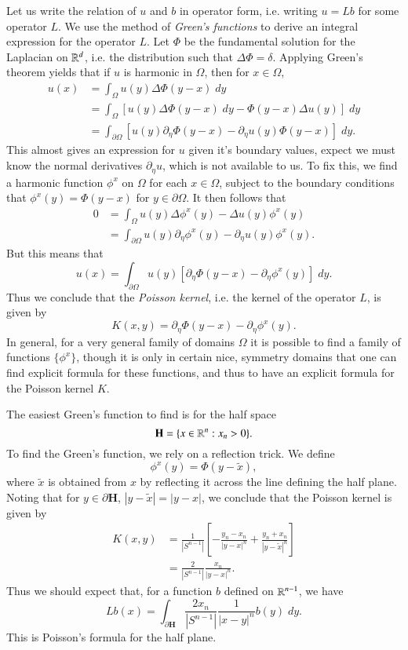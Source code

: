 Let us write the relation of $u$ and $b$ in operator form, i.e. writing $u = Lb$ for some operator $L$. We use the method of \emph{Green's functions} to derive an integral expression for the operator $L$. Let $\Phi$ be the fundamental solution for the Laplacian on $\operatorname{\mathbb{R}}^d$, i.e. the distribution such that $\Delta \Phi = \delta$. Applying Green's theorem yields that if $u$ is harmonic in $\Omega$, then for $x \in \Omega$,
%
\begin{align*}
    u(x) &= \int_\Omega u(y) \Delta \Phi(y - x)\; dy\\
    &= \int_\Omega \left[ u(y) \Delta \Phi(y - x)\; dy - \Phi(y - x) \Delta u (y) \right] \; dy\\
    &= \int_{\partial \Omega} \left[ u(y) \partial_\eta \Phi(y - x) - \partial_\eta u(y) \Phi(y - x) \right]\; dy.
\end{align*}
%
This almost gives an expression for $u$ given it's boundary values, expect we must know the normal derivatives $\partial_\eta u$, which is not available to us. To fix this, we find a harmonic function $\phi^x$ on $\Omega$ for each $x \in \Omega$, subject to the boundary conditions that $\phi^x(y) = \Phi(y - x)$ for $y \in \partial \Omega$. It then follows that
%
\begin{align*}
    0 &= \int_\Omega u(y) \Delta \phi^x(y) - \Delta u(y) \phi^x(y)\\
    &= \int_{\partial \Omega} u(y) \partial_\eta \phi^x(y) - \partial_\eta u(y) \phi^x(y).
\end{align*}
%
But this means that
%
\[ u(x) = \int_{\partial \Omega} u(y) \left[ \partial_\eta \Phi(y - x) - \partial_\eta \phi^x(y) \right]\; dy. \]
%
Thus we conclude that the \emph{Poisson kernel}, i.e. the kernel of the operator $L$, is given by
%
\[ K(x,y) = \partial_\eta \Phi(y - x) - \partial_\eta \phi^x(y). \]
%
In general, for a very general family of domains $\Omega$ it is possible to find a family of functions $\{ \phi^x \}$, though it is only in certain nice, symmetry domains that one can find explicit formula for these functions, and thus to have an explicit formula for the Poisson kernel $K$.

The easiest Green's function to find is for the half space
%
\[ \mathbf{H} = \{ x \in \operatorname{\mathbb{R}}^n : x_n > 0 \}. \]
%
To find the Green's function, we rely on a reflection trick. We define
%
\[ \phi^x(y) = \Phi(y - \tilde{x}), \]
%
where $\tilde{x}$ is obtained from $x$ by reflecting it across the line defining the half plane. Noting that for $y \in \partial \mathbf{H}$, $|y - \tilde{x}| = |y - x|$, we conclude that the Poisson kernel is given by
%
\begin{align*}
    K(x,y) &= \frac{1}{|S^{n-1}|} \left[ - \frac{y_n - x_n}{|y - x|^n} + \frac{y_n + x_n}{|y - \tilde{x}|^n} \right]\\
    &= \frac{2}{|S^{n-1}|} \frac{x_n}{|y - x|^n}.
\end{align*}
%
Thus we should expect that, for a function $b$ defined on $\operatorname{\mathbb{R}}^{n-1}$, we have
%
\[ Lb(x) = \int_{\partial \mathbf{H}} \frac{2x_n}{|S^{n-1}|} \frac{1}{|x - y|^n} b(y)\; dy. \]
%
This is Poisson's formula for the half plane.


